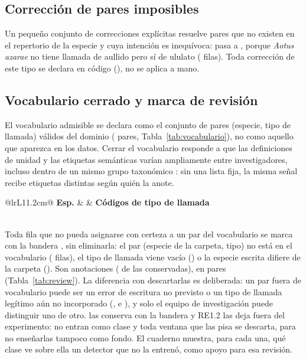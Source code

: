 \documentclass[12pt,a4paper]{article}
\begin{document}
\subsection{Corrección de pares imposibles}

Un pequeño conjunto de correcciones explícitas resuelve pares que no existen en el repertorio
de la especie y cuya intención es inequívoca:  pasa a , porque
\textit{Aotus azarae} no tiene llamada de aullido pero sí de ululato (\nFixed{} filas). Toda
corrección de este tipo se declara en código (), no se aplica a mano.

\subsection{Vocabulario cerrado y marca de revisión}
\label{sec:vocabulario}

El vocabulario admisible se declara como el conjunto de pares (especie, tipo de llamada)
válidos del dominio (\nVocab{} pares, Tabla~\ref{tab:vocabulario}), no como aquello que
aparezca en los datos. Cerrar el vocabulario responde a que las definiciones de unidad y las
etiquetas semánticas varían ampliamente entre investigadores, incluso dentro de un mismo grupo
taxonómico \citep{kershenbaum_acoustic_2016}: sin una lista fija, la misma señal recibe
etiquetas distintas según quién la anote.

\begin{table}[htbp]
    \centering
    \caption{Vocabulario cerrado ( en )}
    \label{tab:vocabulario}
    \small
    \begin{tabular}{@{}lrL{11.2cm}@{}}
        \toprule
        \textbf{Esp.} &  & \textbf{Códigos de tipo de llamada} \\
        \midrule
         \\
        \bottomrule
    \end{tabular}
\end{table}

Toda fila que no pueda asignarse con certeza a un par del vocabulario se marca con la bandera
, sin eliminarla: el par (especie de la carpeta, tipo) no está en el
vocabulario (\nReviewVocab{} filas), el tipo de llamada viene vacío (\nEmptyCall{}) o la
especie escrita difiere de la carpeta (\nSpeciesMismatch{}). Son \nReview{} anotaciones
(\pctReview{} de las conservadas), en \nReviewPairs{} pares (Tabla~\ref{tab:review}). La
diferencia con descartarlas es deliberada: un par fuera de vocabulario puede ser un error de
escritura no previsto o un tipo de llamada legítimo aún no incorporado (,
 e ), y solo el equipo de investigación puede distinguir uno de otro.
 las conserva con la bandera y RE1.2 las deja fuera del experimento: no entran
como clase y toda ventana que las pisa se descarta, para no enseñarlas tampoco como fondo. El
cuaderno  muestra, para cada una, qué clase ve
sobre ella un detector que no la entrenó, como apoyo para esa revisión.
\end{document}
